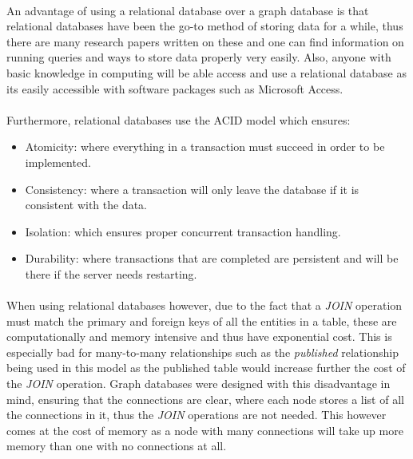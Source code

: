 \paragraph{ }An advantage of using a relational database over a graph database is that relational databases have been the go-to method of storing data for a while, thus there are many research papers written on these and one can find information on running queries and ways to store data properly very easily. Also, anyone with basic knowledge in computing will be able access and use a relational database as its easily accessible with software packages such as Microsoft Access.

\paragraph{ }Furthermore, relational databases use the ACID model which ensures:
\begin{itemize}
	\item Atomicity: where everything in a transaction must succeed in order to be implemented.
	\item Consistency: where a transaction will only leave the database if it is consistent with the data.
	\item Isolation: which ensures proper concurrent transaction handling.
	\item Durability: where transactions that are completed are persistent and will be there if the server needs restarting.
\end{itemize}

\paragraph{ }When using relational databases however, due to the fact that a \textit{JOIN} operation must match the primary and foreign keys of all the entities in a table, these are computationally and memory intensive and thus have exponential cost. This is especially bad for many-to-many relationships such as the \textit{published} relationship being used in this model as the published table would increase further the cost of the \textit{JOIN} operation. Graph databases were designed with this disadvantage in mind, ensuring that the connections are clear, where each node stores a list of all the connections in it, thus the \textit{JOIN} operations are not needed. This however comes at the cost of memory as a node with many connections will take up more memory than one with no connections at all.